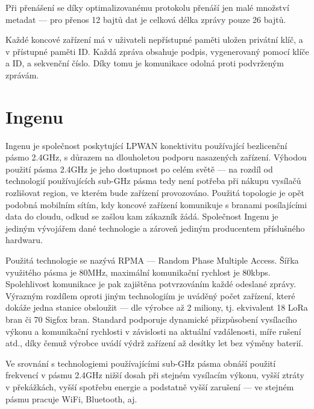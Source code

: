 Při přenášení se díky optimalizovanému protokolu přenáší jen malé množství 
metadat --- pro přenos 12 bajtů dat je celková délka zprávy pouze 26 bajtů.

Každé koncové zařízení má v uživateli nepřístupné paměti uložen privátní klíč, a 
v přístupné paměti ID. Každá zpráva obsahuje podpis, vygenerovaný pomocí klíče a 
ID, a sekvenční číslo. Díky tomu je komunikace odolná proti podvrženým zprávám.

\section{Ingenu}

Ingenu je společnost poskytující LPWAN konektivitu používající bezlicenční 
pásmo 2.4GHz, s důrazem na dlouholetou podporu nasazených zařízení. Výhodou 
použití pásma 2.4GHz je jeho dostupnost po celém světě --- na rozdíl od 
technologií používajících sub-GHz pásma tedy není potřeba při nákupu vysílačů 
rozlišovat
region, ve kterém bude zařízení provozováno. Použitá topologie je opět podobná mobilním 
sítím, kdy koncové zařízení komunikuje s branami posílajícími data do cloudu,
odkud se zašlou kam zákazník žádá. Společnost Ingenu je jediným vývojářem 
dané technologie a zároveň jediným producentem příslušného hardwaru.

Použitá technologie se nazývá RPMA --- Random Phase Multiple Access. Šířka 
využitého pásma je 80MHz, maximální komunikační rychlost je 80kbps. Spolehlivost
komunikace je pak zajištěna potvrzováním každé odeslané zprávy. Výrazným 
rozdílem oproti jiným technologiím je uváděný počet zařízení, které dokáže jedna 
stanice obsloužit --- dle výrobce až 2 miliony, tj. ekvivalent 18 LoRa bran či 
70 Sigfox bran. Standard podporuje dynamické přizpůsobení vysílacího výkonu a 
komunikační rychlosti v závislosti na aktuální vzdálenosti, míře rušení atd., 
díky čemuž výrobce uvádí výdrž zařízení až desítky let bez výměny baterií.

Ve srovnání s technologiemi používajícími sub-GHz pásma obnáší použití frekvencí 
v pásmu 2.4GHz nižší dosah při stejném vysílacím výkonu, vyšší ztráty v 
překážkách, vyšší spotřebu energie a podstatně vyšší zarušení --- ve stejném 
pásmu pracuje WiFi, Bluetooth,  aj.

